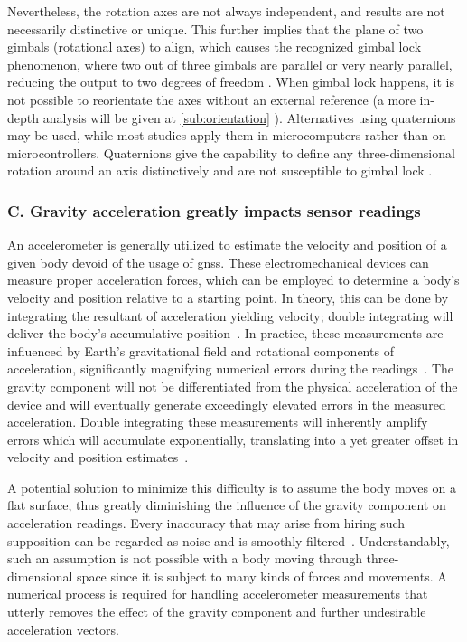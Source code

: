 Nevertheless, the rotation axes are not always independent, and results are not necessarily distinctive or unique. This further implies that the plane of two gimbals (rotational axes) to align, which causes the recognized gimbal lock phenomenon, where two out of three gimbals are parallel or very nearly parallel, reducing the output to two degrees of freedom \cite{hemingway2018perspectives}. When gimbal lock happens, it is not possible to reorientate the axes without an external reference (a more in-depth analysis will be given at \ref{sub:orientation} ).
Alternatives using quaternions may be used, while most studies apply them in microcomputers rather than on microcontrollers. Quaternions give the capability to define any three-dimensional rotation around an axis distinctively and are not susceptible to gimbal lock \cite{alaimo2013comparison}.

\subsubsection{C. Gravity acceleration greatly impacts sensor readings}
An accelerometer is generally utilized to estimate the velocity and position of a given body devoid of the usage of \acrshort{gnss}. These electromechanical devices can measure proper acceleration forces, which can be employed to determine a body's velocity and position relative to a starting point. In theory, this can be done by integrating the resultant of acceleration yielding velocity; double integrating will deliver the body's accumulative position~\cite{yang2006simple}. In practice, these measurements are influenced by Earth's gravitational field and rotational components of acceleration, significantly magnifying numerical errors during the readings~\cite{nistler2011gravity}. The gravity component will not be differentiated from the physical acceleration of the device and will eventually generate exceedingly elevated errors in the measured acceleration. Double integrating these measurements will inherently amplify errors which will accumulate exponentially, translating into a yet greater offset in velocity and position estimates~\cite{thong2004numerical}.

A potential solution to minimize this difficulty is to assume the body moves on a flat surface, thus greatly diminishing the influence of the gravity component on acceleration readings. Every inaccuracy that may arise from hiring such supposition can be regarded as noise and is smoothly filtered~\cite{nistler2011gravity}. Understandably, such an assumption is not possible with a body moving through three-dimensional space since it is subject to many kinds of forces and movements.  A numerical process is required for handling accelerometer measurements that utterly removes the effect of the gravity component and further undesirable acceleration vectors.




